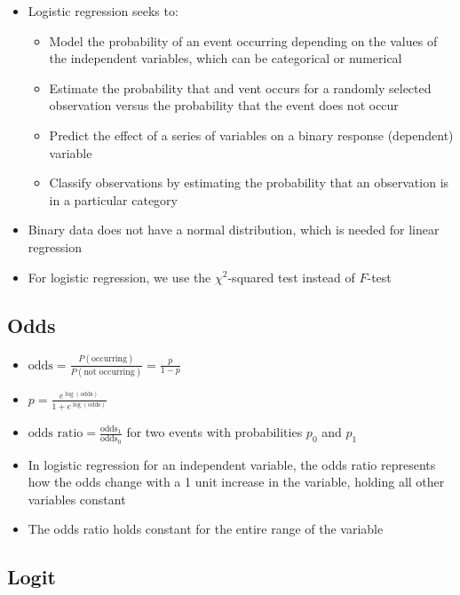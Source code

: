 \documentclass{article}
\begin{document}
\begin{itemize}
    \item Logistic regression seeks to:
    \begin{itemize}
        \item Model the probability of an event occurring depending on the values of the independent variables, which can be categorical or numerical
        \item Estimate the probability that and vent occurs for a randomly selected observation versus the probability that the event does not occur
        \item Predict the effect of a series of variables on a binary response (dependent) variable
        \item Classify observations by estimating the probability that an observation is in a particular category
    \end{itemize}
    \item Binary data does not have a normal distribution, which is needed for linear regression
    \item For logistic regression, we use the $\chi^2$-squared test instead of $F$-test
\end{itemize}

\subsection{Odds}

\begin{itemize}
    \item $\text{odds}=\frac{P(\text{occurring})}{P(\text{not occurring})}=\frac{p}{1-p}$
    \item $p=\frac{e^{\log(\text{odds})}}{1+e^{\log(\text{odds})}}$
    \item $\text{odds ratio}=\frac{\text{odds}_1}{\text{odds}_0}$ for two events with probabilities $p_0$ and $p_1$
    \item In logistic regression for an independent variable, the odds ratio represents how the odds change with a 1 unit increase in the variable, holding all other variables constant
    \item The odds ratio holds constant for the entire range of the variable
\end{itemize}

\subsection{Logit}
\end{document}
